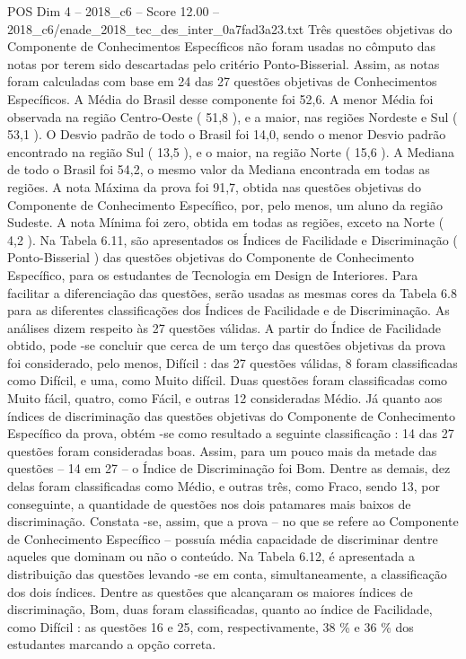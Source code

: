 \begin{textsample}{POS Dim 4 – 2018\_c6 – Score 12.00 – 2018\_c6/enade\_2018\_tec\_des\_inter\_0a7fad3a23.txt}
Três questões objetivas do Componente de Conhecimentos Específicos não foram usadas no cômputo das notas por terem sido descartadas pelo critério Ponto-Bisserial.
Assim, as notas foram calculadas com base em 24 das 27 questões objetivas de Conhecimentos Específicos.
A Média do Brasil desse componente foi 52,6.
A menor Média foi observada na região Centro-Oeste ( 51,8 ), e a maior, nas regiões Nordeste e Sul ( 53,1 ).
O Desvio padrão de todo o Brasil foi 14,0, sendo o menor Desvio padrão encontrado na região Sul ( 13,5 ), e o maior, na região Norte ( 15,6 ).
A Mediana de todo o Brasil foi 54,2, o mesmo valor da Mediana encontrada em todas as regiões.
A nota Máxima da prova foi 91,7, obtida nas questões objetivas do Componente de Conhecimento Específico, por, pelo menos, um aluno da região Sudeste.
A nota Mínima foi zero, obtida em todas as regiões, exceto na Norte ( 4,2 ).
Na Tabela 6.11, são apresentados os Índices de Facilidade e Discriminação ( Ponto-Bisserial ) das questões objetivas do Componente de Conhecimento Específico, para os estudantes de Tecnologia em Design de Interiores.
Para facilitar a diferenciação das questões, serão usadas as mesmas cores da Tabela 6.8 para as diferentes classificações dos Índices de Facilidade e de Discriminação.
As análises dizem respeito às 27 questões válidas.
A partir do Índice de Facilidade obtido, pode -se concluir que cerca de um terço das questões objetivas da prova foi considerado, pelo menos, Difícil : das 27 questões válidas, 8 foram classificadas como Difícil, e uma, como Muito difícil.
Duas questões foram classificadas como Muito fácil, quatro, como Fácil, e outras 12 consideradas Médio.
Já quanto aos índices de discriminação das questões objetivas do Componente de Conhecimento Específico da prova, obtém -se como resultado a seguinte classificação : 14 das 27 questões foram consideradas boas.
Assim, para um pouco mais da metade das questões – 14 em 27 – o Índice de Discriminação foi Bom.
Dentre as demais, dez delas foram classificadas como Médio, e outras três, como Fraco, sendo 13, por conseguinte, a quantidade de questões nos dois patamares mais baixos de discriminação.
Constata -se, assim, que a prova – no que se refere ao Componente de Conhecimento Específico – possuía média capacidade de discriminar dentre aqueles que dominam ou não o conteúdo.
Na Tabela 6.12, é apresentada a distribuição das questões levando -se em conta, simultaneamente, a classificação dos dois índices.
Dentre as questões que alcançaram os maiores índices de discriminação, Bom, duas foram classificadas, quanto ao índice de Facilidade, como Difícil : as questões 16 e 25, com, respectivamente, 38 \% e 36 \% dos estudantes marcando a opção correta.

\end{textsample}
